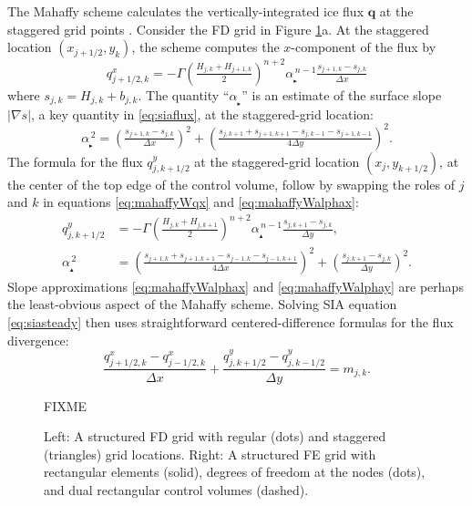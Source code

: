 \documentclass[11pt]{amsart}
\newcommand\bq{\mathbf{q}}
\newcommand{\grad}{\nabla}
\newcommand\alpharight{\alpha_{{}_{\blacktriangleright}}}
\newcommand\alphaup{\alpha_{{\!}_{\blacktriangle}}}
\begin{document}
The Mahaffy scheme calculates the vertically-integrated ice flux $\bq$ at the staggered grid points \cite[equations (19), (20)]{Mahaffy1976}.  Consider the FD grid in Figure \ref{fig:fdfemgrids}a.  At the staggered location $(x_{j+1/2},y_k)$, the scheme computes the $x$-component of the flux by
\begin{equation}
q^x_{j+1/2,k} = - \Gamma \left(\tfrac{H_{j,k} + H_{j+1,k}}{2}\right)^{n+2} \alpharight^{\,n-1} \tfrac{s_{j+1,k} - s_{j,k}}{\Delta x}  \label{eq:mahaffyWqx}
\end{equation}
where $s_{j,k} = H_{j,k} + b_{j,k}$.  The quantity ``$\alpharight$\!'' is an estimate of the surface slope $|\grad s|$, a key quantity in \eqref{eq:siaflux}, at the staggered-grid location:
\begin{equation}
\alpharight^{\,2} = \left(\tfrac{s_{j+1,k} - s_{j,k}}{\Delta x}\right)^2 + \left(\tfrac{s_{j,k+1} + s_{j+1,k+1} - s_{j,k-1} - s_{j+1,k-1}}{4 \Delta y}\right)^2.  \label{eq:mahaffyWalphax}
\end{equation}
The formula for the flux $q^y_{j,k+1/2}$ at the staggered-grid location $(x_j,y_{k+1/2})$, at the center of the top edge of the control volume, follow by swapping the roles of $j$ and $k$ in equations \eqref{eq:mahaffyWqx} and \eqref{eq:mahaffyWalphax}:
\begin{align}
q^y_{j,k+1/2} &= - \Gamma \left(\tfrac{H_{j,k} + H_{j,k+1}}{2}\right)^{n+2} \alphaup^{\,n-1} \tfrac{s_{j,k+1} - s_{j,k}}{\Delta y}, \label{eq:mahaffyWqy} \\
\alphaup^{\,2} &= \left(\tfrac{s_{j+1,k} + s_{j+1,k+1} - s_{j-1,k} - s_{j-1,k+1}}{4 \Delta x}\right)^2 + \left(\tfrac{s_{j,k+1} - s_{j,k}}{\Delta y}\right)^2.  \label{eq:mahaffyWalphay}
\end{align}
Slope approximations \eqref{eq:mahaffyWalphax} and \eqref{eq:mahaffyWalphay} are perhaps the least-obvious aspect of the Mahaffy scheme.  Solving SIA equation \eqref{eq:siasteady} then uses straightforward centered-difference formulas \cite{MortonMayers2005} for the flux divergence:
\begin{equation}
\frac{q^x_{j+1/2,k} - q^x_{j-1/2,k}}{\Delta x} + \frac{q^y_{j,k+1/2}- q^y_{j,k-1/2}}{\Delta y} = m_{j,k}.
\end{equation}

\begin{figure}[ht]
\begin{center}
FIXME
\end{center}
\caption{Left: A structured FD grid with regular (dots) and staggered (triangles) grid locations.  Right: A structured FE grid with rectangular elements (solid), degrees of freedom at the nodes (dots), and dual rectangular control volumes (dashed).}
\label{fig:fdfemgrids}
\end{figure}
\end{document}
